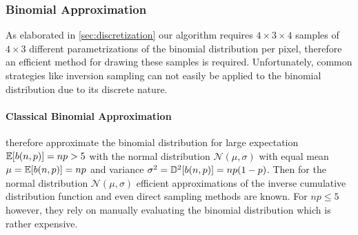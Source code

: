 \subsubsection{Binomial Approximation}
\label{sec:approximation}



As elaborated in \cref{sec:discretization} our algorithm requires $4\times3\times4$ samples of $4\times3$ different parametrizations of the binomial distribution per pixel, therefore an efficient method for drawing these samples is required.
%
Unfortunately, common strategies like inversion sampling can not easily be applied to the binomial distribution due to its discrete nature.

\paragraph{Classical Binomial Approximation}
%
\textcite{zirr2016} therefore approximate the binomial distribution for large expectation $\expectation{b(n,p)}=np>5$ with the normal distribution $\mathcal{N}(\mu,\sigma)$ with equal mean $\mu=\expectation{b(n,p)}=np$ and variance $\sigma^2=\variance{b(n,p)}=np(1-p)$.
%
Then for the normal distribution $\mathcal{N}(\mu,\sigma)$ efficient approximations of the inverse cumulative distribution function \parencite[e.g.,][]{giles2012} and even direct sampling methods \parencite[e.g.,][]{box1958} are known.
%
For $np \le 5$ however, they rely on manually evaluating the binomial distribution which is rather expensive.


